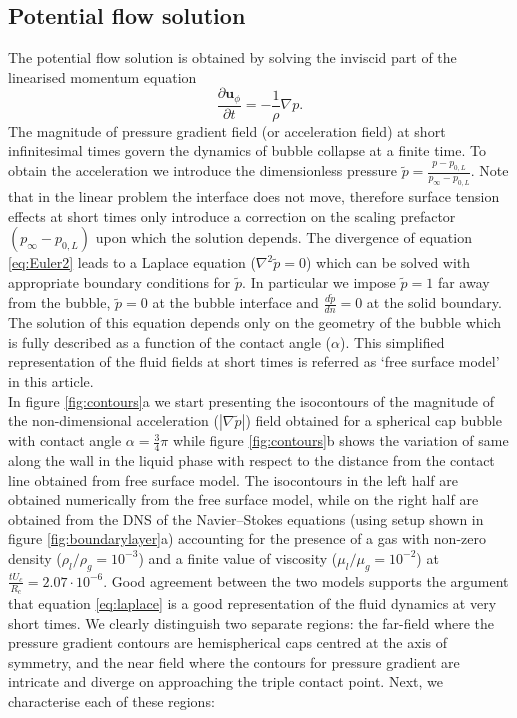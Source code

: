 \documentclass[final]{jfm}
\begin{document}
\subsection{Potential flow solution}
The potential flow solution is obtained by solving the inviscid part of the linearised momentum equation
\begin{equation}
    \frac{\partial {\mathbf u}_{\phi}}{\partial t} = -\frac{1}{\rho} \nabla p.
    \label{eq:Euler2}
\end{equation}
  The magnitude of pressure gradient field (or  acceleration field) at short infinitesimal times govern the dynamics of bubble collapse at a finite time.  To obtain the acceleration we introduce the dimensionless pressure $\tilde{p}=\frac{p-p_{0,L}}{p_\infty - p_{0,L}}$. Note that in the linear problem the interface does not move,
therefore surface tension effects at short times only introduce a correction on the scaling prefactor $(p_\infty-p_{0,L})$ upon which the solution depends. The divergence of equation \ref{eq:Euler2} leads to a Laplace equation ($\nabla^2 \tilde{p} = 0$) which can be solved with appropriate boundary conditions for $\tilde{p}$. In particular we impose $\tilde{p}=1$ far away from the bubble, $\tilde{p}=0$ at the bubble interface and $\frac{d\tilde{p}}{dn} = 0$ at the solid boundary. The solution of this equation depends only on the geometry of the bubble
which is fully described as a function of the contact angle ($\alpha$). This simplified representation of the fluid fields at short times is referred as `free surface model' in this article.\\
 
In figure \ref{fig:contours}a we start presenting the isocontours of the  magnitude of the non-dimensional acceleration ($|\nabla \tilde{p}|$) field obtained for a spherical cap bubble with contact angle $\alpha= \frac{3}{4}\pi$ while figure \ref{fig:contours}b shows the variation of same along the wall in the liquid phase with respect to the distance from the contact line obtained from free surface model. The isocontours in the left half are obtained numerically from the free surface model, while on the right half are obtained from the DNS of the Navier--Stokes equations (using setup shown in figure \ref{fig:boundarylayer}a) accounting for the presence of a gas with non-zero density ($\rho_l/\rho_g = 10^{-3}$) and a finite value of viscosity ($\mu_l/\mu_g = 10^{-2}$) at $\frac{t U_c}{R_c} = 2.07 \cdot 10^{-6}$. Good agreement between the two models supports the argument that equation \ref{eq:laplace} is a good representation of the fluid dynamics at very short times. We clearly distinguish two separate regions: the far-field where the pressure gradient contours are hemispherical caps centred at the axis of symmetry, and the near field where the contours for pressure gradient are intricate and diverge on approaching the triple contact point.
Next, we characterise each of these regions:
\end{document}
